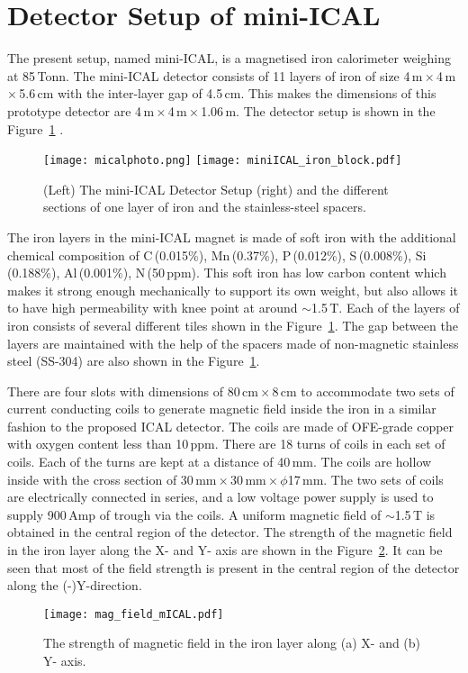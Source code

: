 \section{Detector Setup of mini-ICAL}
The present setup, named mini-ICAL, is a magnetised iron calorimeter
weighing at 85\,Tonn. The mini-ICAL detector consists of 11 layers
of iron of size 4\,m\,$\times$\,4\,m\,$\times$\,5.6\,cm with the
inter-layer gap of 4.5\,cm. This makes the dimensions of this
prototype detector are 4\,m\,$\times$\,4\,m\,$\times$\,1.06\,m.
The detector setup is shown in the Figure~\ref{fig:miniICAL_iron}
.
\begin{figure}[h]
  \centering
  \texttt{[image: micalphoto.png]}
  \texttt{[image: miniICAL\_iron\_block.pdf]}
  \caption{(Left) The mini-ICAL Detector Setup (right) and the
    different sections of one layer of iron and the stainless-steel
    spacers.}
  \label{fig:miniICAL_iron}
\end{figure}
The iron layers in the mini-ICAL magnet is made of soft iron with
the additional chemical composition of C\,(0.015\%), Mn\,(0.37\%),
P\,(0.012\%), S\,(0.008\%), Si\,(0.188\%), Al\,(0.001\%), N\,(50\,ppm). %
This soft iron has low carbon content which makes it strong enough
mechanically to support its own weight, but also allows it to have high
permeability with knee point at around $\sim$1.5\,T.
Each of the layers of iron consists of several different tiles shown
in the Figure~\ref{fig:miniICAL_iron}.
The gap between the layers are maintained with the help of the spacers
made of non-magnetic stainless steel (SS-304) are also shown in the
Figure~\ref{fig:miniICAL_iron}.

There are four slots with dimensions of 80\,cm\,$\times$\,8\,cm to
accommodate two sets of current conducting coils to generate magnetic
field inside the iron in a similar fashion to the proposed
ICAL detector. The coils are made of OFE-grade copper with
oxygen content less than 10\,ppm. There are 18 turns of coils in each
set of coils. Each of the turns are kept at a distance of 40\,mm.
The coils are hollow inside with the cross section of
30\,mm\,$\times$\,30\,mm\,$\times$\,$\phi$17\,mm.
The two sets of coils are electrically connected in series,
and a low voltage power supply is used to supply 900\,Amp
of trough via the coils. A uniform magnetic field of $\sim$1.5\,T
is obtained in the central region of the detector.
The strength of the magnetic field in the iron layer along the X- and Y-
axis are shown in the Figure~\ref{fig:magfieldmical}. It can be seen
that most of the field strength is present in the central region of the
detector along the (-)Y-direction.
\begin{figure}[h]
  \centering
  \texttt{[image: mag\_field\_mICAL.pdf]}
  \caption{The strength of magnetic field in the iron layer along (a) X-
    and (b) Y- axis.}
  \label{fig:magfieldmical}
\end{figure}

